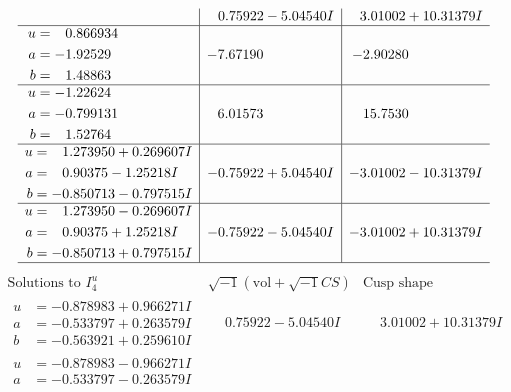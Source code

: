 \documentclass[1p]{elsarticle_modified}
\theoremstyle{definition}
\newcommand{\I}{\sqrt{-1}}
\begin{document}
$$\begin{array}{c|c|c}
 & \phantom{-}0.75922 - 5.04540 I & \phantom{-}3.01002 + 10.31379 I \\ \hline\begin{aligned}
u &= \phantom{-}0.866934\phantom{ +0.000000I} \\
a &= -1.92529\phantom{ +0.000000I} \\
b &= \phantom{-}1.48863\phantom{ +0.000000I}\end{aligned}
 & -7.67190\phantom{ +0.000000I} & -2.90280\phantom{ +0.000000I} \\ \hline\begin{aligned}
u &= -1.22624\phantom{ +0.000000I} \\
a &= -0.799131\phantom{ +0.000000I} \\
b &= \phantom{-}1.52764\phantom{ +0.000000I}\end{aligned}
 & \phantom{-}6.01573\phantom{ +0.000000I} & \phantom{-}15.7530\phantom{ +0.000000I} \\ \hline\begin{aligned}
u &= \phantom{-}1.273950 + 0.269607 I \\
a &= \phantom{-}0.90375 - 1.25218 I \\
b &= -0.850713 - 0.797515 I\end{aligned}
 & -0.75922 + 5.04540 I & -3.01002 - 10.31379 I \\ \hline\begin{aligned}
u &= \phantom{-}1.273950 - 0.269607 I \\
a &= \phantom{-}0.90375 + 1.25218 I \\
b &= -0.850713 + 0.797515 I\end{aligned}
 & -0.75922 - 5.04540 I & -3.01002 + 10.31379 I\\
 \hline 
 \end{array}$$\newpage$$\begin{array}{c|c|c}  
\text{Solutions to }I^u_{4}& \I (\text{vol} + \sqrt{-1}CS) & \text{Cusp shape}\\
 \hline 
\begin{aligned}
u &= -0.878983 + 0.966271 I \\
a &= -0.533797 + 0.263579 I \\
b &= -0.563921 + 0.259610 I\end{aligned}
 & \phantom{-}0.75922 - 5.04540 I & \phantom{-}3.01002 + 10.31379 I \\ \hline\begin{aligned}
u &= -0.878983 - 0.966271 I \\
a &= -0.533797 - 0.263579 I \\

\end{aligned}
\end{array}$$
\end{document}
